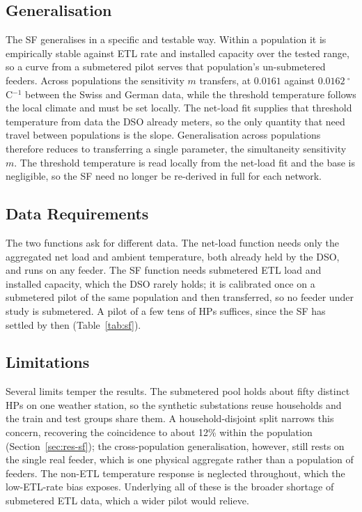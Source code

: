 \documentclass[9pt,journal,a4]{IEEEtran}
\begin{document}
\subsection{Generalisation}

The SF generalises in a specific and testable way. Within a population it is empirically stable against ETL rate and installed capacity over the tested range, so a curve from a submetered pilot serves that population's un-submetered feeders. Across populations the sensitivity $m$ transfers, at $0.0161$ against $0.0162~^\circ$C$^{-1}$ between the Swiss and German data, while the threshold temperature follows the local climate and must be set locally. The net-load fit supplies that threshold temperature from data the DSO already meters, so the only quantity that need travel between populations is the slope. Generalisation across populations therefore reduces to transferring a single parameter, the simultaneity sensitivity $m$. The threshold temperature is read locally from the net-load fit and the base is negligible, so the SF need no longer be re-derived in full for each network.

\subsection{Data Requirements}

The two functions ask for different data. The net-load function needs only the aggregated net load and ambient temperature, both already held by the DSO, and runs on any feeder. The SF function needs submetered ETL load and installed capacity, which the DSO rarely holds; it is calibrated once on a submetered pilot of the same population and then transferred, so no feeder under study is submetered. A pilot of a few tens of HPs suffices, since the SF has settled by then (Table~\ref{tab:sf}).

\subsection{Limitations}

Several limits temper the results. The submetered pool holds about fifty distinct HPs on one weather station, so the synthetic substations reuse households and the train and test groups share them. A household-disjoint split narrows this concern, recovering the coincidence to about 12\% within the population (Section~\ref{sec:res-sf}); the cross-population generalisation, however, still rests on the single real feeder, which is one physical aggregate rather than a population of feeders. The non-ETL temperature response is neglected throughout, which the low-ETL-rate bias exposes. Underlying all of these is the broader shortage of submetered ETL data, which a wider pilot would relieve.
\end{document}
